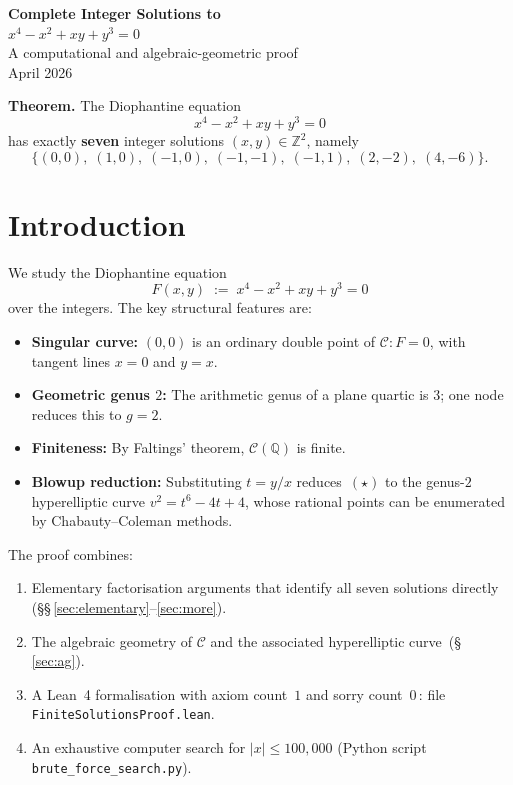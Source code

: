 \documentclass[12pt, a4paper]{article}
\theoremstyle{definition}
\newcommand{\Z}{\mathbb{Z}}
\newcommand{\Q}{\mathbb{Q}}
\begin{document}
\begin{center}
  {\LARGE\bfseries Complete Integer Solutions to}\\[6pt]
  {\LARGE\bfseries $x^4 - x^2 + xy + y^3 = 0$}\\[12pt]
  {\large A computational and algebraic-geometric proof}\\[4pt]
  {\normalsize April 2026}
\end{center}

\vspace{1em}
\begin{tcolorbox}[colback=blue!4, colframe=blue!60, title=Main Result]
\textbf{Theorem.} The Diophantine equation
\[
  x^4 - x^2 + xy + y^3 = 0 \tag{$\star$}
\]
has exactly \textbf{seven} integer solutions $(x,y)\in\Z^2$, namely
\[
  \{(0,0),\;(1,0),\;(-1,0),\;(-1,-1),\;(-1,1),\;(2,-2),\;(4,-6)\}.
\]
\end{tcolorbox}

\tableofcontents

\section{Introduction}

We study the Diophantine equation
\[
  F(x,y) \;:=\; x^4 - x^2 + xy + y^3 = 0 \tag{$\star$}
\]
over the integers.  The key structural features are:

\begin{itemize}
  \item \textbf{Singular curve:} $(0,0)$ is an ordinary double point of $\mathcal{C}: F=0$, with
        tangent lines $x = 0$ and $y = x$.
  \item \textbf{Geometric genus $2$:} The arithmetic genus of a plane quartic is $3$; one node
        reduces this to $g = 2$.
  \item \textbf{Finiteness:} By Faltings' theorem, $\mathcal{C}(\Q)$ is finite.
  \item \textbf{Blowup reduction:} Substituting $t = y/x$ reduces~$(\star)$ to the genus-$2$
        hyperelliptic curve $v^2 = t^6 - 4t + 4$, whose rational points can be
        enumerated by Chabauty--Coleman methods.
\end{itemize}

\noindent
The proof combines:
\begin{enumerate}
  \item Elementary factorisation arguments that identify all seven solutions directly
        (\S\S\,\ref{sec:elementary}--\ref{sec:more}).
  \item The algebraic geometry of $\mathcal{C}$ and the associated hyperelliptic curve~(\S\,\ref{sec:ag}).
  \item A Lean~4 formalisation with axiom count~$1$ and sorry count~$0$\,:
        file \texttt{FiniteSolutionsProof.lean}.
  \item An exhaustive computer search for $|x| \leq 100{,}000$ (Python script
        \texttt{brute\_force\_search.py}).
\end{enumerate}
\end{document}
